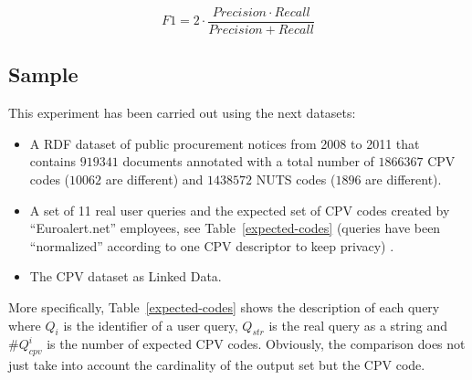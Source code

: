 \begin{equation}\label{eq-3}
F1 = 2 \cdot \frac{Precision \cdot Recall}{ Precision + Recall}
\end{equation}

\subsection{Sample}
This experiment has been carried out using the next datasets:
\begin{itemize}
\item A RDF dataset of public procurement notices from 2008 to 2011 that contains $919341$ documents annotated with 
a total number of $1866367$ CPV codes ($10062$ are different) and $1438572$ NUTS codes ($1896$ are different).
\item A set of 11 real user queries and the expected set of CPV codes created by ``Euroalert.net'' employees, see Table~\ref{expected-codes} 
(queries have been ``normalized'' according to one CPV descriptor to keep privacy) .
\item The CPV dataset as Linked Data.
\end{itemize}

More specifically, Table~\ref{expected-codes} shows the description of each query where $Q_{i}$ is the identifier 
of a user query, $Q_{str}$ is the real query as a string and $\#Q^{i}_{cpv}$ is the number of expected CPV codes. Obviously, the comparison 
does not just take into account the cardinality of the output set but the CPV code.

